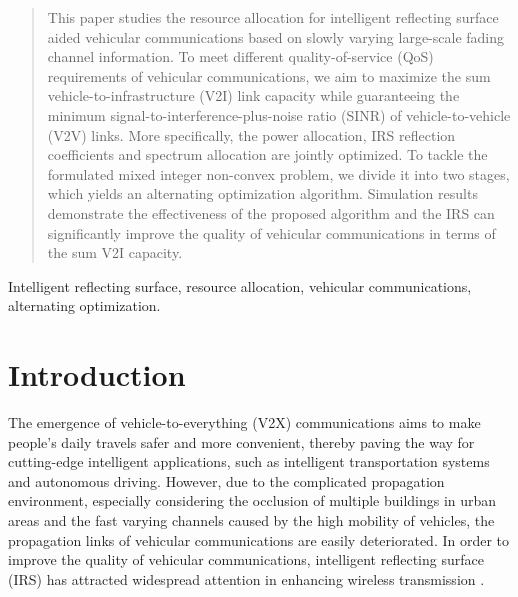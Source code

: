 \documentclass[journal]{IEEEtran}
\begin{document}
\begin{abstract}
This paper studies the resource allocation for intelligent reflecting surface aided vehicular communications based on slowly varying large-scale fading channel information. To meet different quality-of-service (QoS) requirements of vehicular communications, we aim to maximize the sum vehicle-to-infrastructure (V2I) link capacity while guaranteeing the minimum signal-to-interference-plus-noise ratio (SINR) of vehicle-to-vehicle (V2V) links. More specifically, the power allocation, IRS reflection coefficients and spectrum allocation are jointly optimized. To tackle the formulated mixed integer non-convex problem, we divide it into two stages, which yields an alternating optimization algorithm. Simulation results demonstrate the effectiveness of the proposed algorithm and the IRS can significantly improve the quality of vehicular communications in terms of the sum V2I capacity.
\end{abstract}

\begin{IEEEkeywords}
Intelligent reflecting surface, resource allocation, vehicular communications, alternating optimization.
\end{IEEEkeywords}


\section{Introduction}

The emergence of vehicle-to-everything (V2X) communications aims to make people's daily travels safer and more convenient, thereby paving the way for cutting-edge intelligent applications, such as intelligent transportation systems and autonomous driving. However, due to the complicated propagation environment, especially considering the occlusion of multiple buildings in urban areas and the fast varying channels caused by the high mobility of vehicles, the propagation links of vehicular communications are easily deteriorated. In order to improve the quality of vehicular communications, intelligent reflecting surface (IRS) has attracted widespread attention in enhancing wireless transmission \cite{IRS-1,zhang1,song}. 
\end{document}
